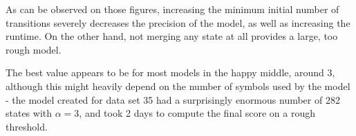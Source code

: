 %		
%		
%		
%		
%
%		
%		

As can be observed on those figures, increasing the minimum initial number of transitions severely decreases the precision of the model, as well as increasing the runtime. On the other hand, not merging any state at all provides a large, too rough model.

The best value appears to be for most models in the happy middle, around 3, although this might heavily depend on the number of symbols used by the model - the model created for data set 35 had a surprisingly enormous number of 282 states with $\alpha = 3$, and took 2 days to compute the final score on a rough threshold.